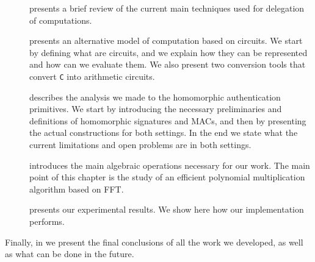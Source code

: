 \begin{description}
  \item[] presents a brief review of the current
    main techniques used for delegation of computations.
  \item[] presents an alternative model of computation
    based on circuits. We start by defining what are circuits, and we explain
    how they can be represented and how can we evaluate them. We also present
    two conversion tools that convert \texttt{C} into arithmetic circuits.
  \item[] describes the analysis we made to the
    homomorphic authentication primitives. We start by introducing the necessary
    preliminaries and definitions of homomorphic signatures and MACs, and then
    by presenting the actual constructions for both settings. In the end we
    state what the current limitations and open problems are in both settings.
  \item[] introduces the main algebraic operations
    necessary for our work. The main point of this chapter is the study of an
    efficient polynomial multiplication algorithm based on FFT.
  \item[] presents our experimental results. We show here
    how our implementation performs.
\end{description}

Finally, in  we present the final conclusions
of all the work we developed, as well as what can be done in the future.
